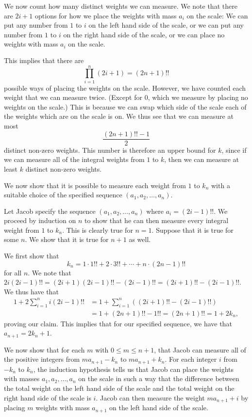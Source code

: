 \documentclass{article}
\begin{document}
\begin{enumerate}[1.]
We now count how many distinct weights we can measure. We note that there are $2i + 1$ options for how we place the weights with mass $a_i$ on the scale: We can put any number from $1$ to $i$ on the left hand side of the scale, or we can put any number from $1$ to $i$ on the right hand side of the scale, or we can place no weights with mass $a_i$ on the scale.

This implies that there are
\[
  \prod_{i = 1}^{n} (2i + 1) = (2n + 1)!!
\]
possible ways of placing the weights on the scale. However, we have counted each weight that we can measure twice. (Except for $0$, which we measure by placing no weights on the scale.) This is because we can swap which side of the scale each of the weights which are on the scale is on. We thus see that we can measure at most
\[
  \frac{(2n + 1)!! - 1}{2}
\]
distinct non-zero weights. This number is therefore an upper bound for $k$, since if we can measure all of the integral weights from $1$ to $k$, then we can measure at least $k$ distinct non-zero weights.

We now show that it is possible to measure each weight from $1$ to $k_n$ with a suitable choice of the specified sequence $(a_1, a_2, \dots, a_n)$.

Let Jacob specify the sequence $(a_1, a_2, \dots, a_n)$ where $a_i = (2i - 1)!!$. We proceed by induction on $n$ to show that he can then measure every integral weight from $1$ to $k_n$. This is clearly true for $n = 1$. Suppose that it is true for some $n$. We show that it is true for $n + 1$ as well.

We first show that
\[
  k_n = 1 \cdot 1!! + 2 \cdot 3!! + \cdots + n \cdot (2n - 1)!!
\]
for all $n$. We note that $2i (2i - 1)!! = (2i + 1) (2i - 1)!! - (2i - 1)!! = (2i + 1)!! - (2i - 1)!!$. We thus have that
\begin{align*}
  1 + 2 \sum_{i = 1}^{n} i (2i - 1)!! & = 1 + \sum_{i = 1}^{n} \left( (2i + 1)!! - (2i - 1)!! \right) \\ 
	& = 1 + (2n + 1)!! - 1!! = (2n + 1)!! = 1 + 2k_n,
\end{align*}
proving our claim. This implies that for our specified sequence, we have that $a_{n + 1} = 2k_n + 1$.

We now show that for each $m$ with $0 \leq m \leq n + 1$, that Jacob can measure all of the positive integers from $m a_{n + 1} - k_n$ to $ma_{n + 1} + k_n$.  For each integer $i$ from $-k_n$ to $k_n$, the induction hypothesis tells us that Jacob can place the weights with masses $a_1, a_2, \dots, a_n$ on the scale in such a way that the difference between the total weight on the left hand side of the scale and the total weight on the right hand side of the scale is $i$. Jacob can then measure the weight $m a_{n + 1} + i$ by placing $m$ weights with mass $a_{n + 1}$ on the left hand side of the scale.


\end{enumerate}
\end{document}
